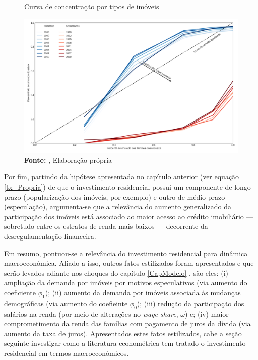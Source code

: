 \begin{figure}[H]
	\centering
	\caption{Curva de concentração por tipos de imóveis}
	\label{FigConcentracao}
	\includegraphics[width=\textwidth]{../../Dados/Fatos_Estilizados/figs/Concentracao_Imoveis.png}
	\caption*{\textbf{Fonte:} \textcite{us_census_bureau_characteristics_2017}, Elaboração própria}
\end{figure}
Por fim, partindo da hipótese apresentada no capítulo anterior (ver equação \ref{tx_Propria}) de que o investimento residencial possui um componente de longo prazo (popularização dos imóveis, por exemplo) e outro de médio prazo (especulação), argumenta-se que a relevância do aumento generalizado da participação dos imóveis
está associado  ao maior acesso ao crédito imobiliário --- sobretudo entre os estratos de renda mais baixos --- decorrente da desregulamentação financeira.

Em resumo, pontuou-se a relevância do investimento residencial para dinâmica macroeconômica.
Aliado a isso, outros fatos estilizados foram apresentados e que serão levados adiante nos choques do capítulo \ref{CapModelo} , são eles:
	(i) ampliação da demanda por imóveis por motivos especulativos (via aumento do coeficiente $\phi_1$);
	(ii) aumento da demanda por imóveis associada às mudanças demográficas (via aumento do coefieinte $\phi_0$);
	(iii) redução da participação dos salários na renda (por meio de alterações no \textit{wage-share}, $\omega$)
	e;  
	(iv) maior comprometimento da renda das famílias com pagamento de juros da dívida (via aumento da taxa de juros).
Apresentados estes fatos estilizados, cabe a seção seguinte investigar como a literatura econométrica tem tratado o investimento residencial em termos macroeconômicos.

